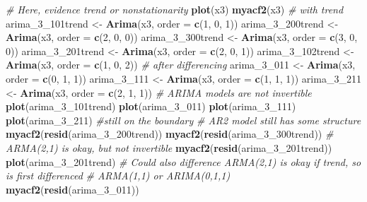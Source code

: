 \documentclass[]{book}
\newenvironment{Shaded}{\begin{snugshade}}{\end{snugshade}}
\newcommand{\KeywordTok}[1]{\textcolor[rgb]{0.13,0.29,0.53}{\textbf{#1}}}
\newcommand{\DataTypeTok}[1]{\textcolor[rgb]{0.13,0.29,0.53}{#1}}
\newcommand{\DecValTok}[1]{\textcolor[rgb]{0.00,0.00,0.81}{#1}}
\newcommand{\StringTok}[1]{\textcolor[rgb]{0.31,0.60,0.02}{#1}}
\newcommand{\CommentTok}[1]{\textcolor[rgb]{0.56,0.35,0.01}{\textit{#1}}}
\newcommand{\NormalTok}[1]{#1}
\begin{document}
\begin{Shaded}
\begin{Highlighting}[]
\CommentTok{# Here, evidence trend or nonstationarity}
\KeywordTok{plot}\NormalTok{(x3)}
\KeywordTok{myacf2}\NormalTok{(x3)}
\CommentTok{# with trend}
\NormalTok{arima_3_101trend <-}\StringTok{ }\KeywordTok{Arima}\NormalTok{(x3, }\DataTypeTok{order =} \KeywordTok{c}\NormalTok{(}\DecValTok{1}\NormalTok{, }\DecValTok{0}\NormalTok{, }\DecValTok{1}\NormalTok{))}
\NormalTok{arima_3_200trend <-}\StringTok{ }\KeywordTok{Arima}\NormalTok{(x3, }\DataTypeTok{order =} \KeywordTok{c}\NormalTok{(}\DecValTok{2}\NormalTok{, }\DecValTok{0}\NormalTok{, }\DecValTok{0}\NormalTok{))}
\NormalTok{arima_3_300trend <-}\StringTok{ }\KeywordTok{Arima}\NormalTok{(x3, }\DataTypeTok{order =} \KeywordTok{c}\NormalTok{(}\DecValTok{3}\NormalTok{, }\DecValTok{0}\NormalTok{, }\DecValTok{0}\NormalTok{))}
\NormalTok{arima_3_201trend <-}\StringTok{ }\KeywordTok{Arima}\NormalTok{(x3, }\DataTypeTok{order =} \KeywordTok{c}\NormalTok{(}\DecValTok{2}\NormalTok{, }\DecValTok{0}\NormalTok{, }\DecValTok{1}\NormalTok{))}
\NormalTok{arima_3_102trend <-}\StringTok{ }\KeywordTok{Arima}\NormalTok{(x3, }\DataTypeTok{order =} \KeywordTok{c}\NormalTok{(}\DecValTok{1}\NormalTok{, }\DecValTok{0}\NormalTok{, }\DecValTok{2}\NormalTok{))}
\CommentTok{# after differencing}
\NormalTok{arima_3_}\DecValTok{011}\NormalTok{ <-}\StringTok{ }\KeywordTok{Arima}\NormalTok{(x3, }\DataTypeTok{order =} \KeywordTok{c}\NormalTok{(}\DecValTok{0}\NormalTok{, }\DecValTok{1}\NormalTok{, }\DecValTok{1}\NormalTok{))}
\NormalTok{arima_3_}\DecValTok{111}\NormalTok{ <-}\StringTok{ }\KeywordTok{Arima}\NormalTok{(x3, }\DataTypeTok{order =} \KeywordTok{c}\NormalTok{(}\DecValTok{1}\NormalTok{, }\DecValTok{1}\NormalTok{, }\DecValTok{1}\NormalTok{))}
\NormalTok{arima_3_}\DecValTok{211}\NormalTok{ <-}\StringTok{ }\KeywordTok{Arima}\NormalTok{(x3, }\DataTypeTok{order =} \KeywordTok{c}\NormalTok{(}\DecValTok{2}\NormalTok{, }\DecValTok{1}\NormalTok{, }\DecValTok{1}\NormalTok{))}
\CommentTok{# ARIMA models are not invertible}
\KeywordTok{plot}\NormalTok{(arima_3_101trend)}
\KeywordTok{plot}\NormalTok{(arima_3_}\DecValTok{011}\NormalTok{)}
\KeywordTok{plot}\NormalTok{(arima_3_}\DecValTok{111}\NormalTok{)}
\KeywordTok{plot}\NormalTok{(arima_3_}\DecValTok{211}\NormalTok{)  }\CommentTok{#still on the boundary}
\CommentTok{# AR2 model still has some structure}
\KeywordTok{myacf2}\NormalTok{(}\KeywordTok{resid}\NormalTok{(arima_3_200trend))}
\KeywordTok{myacf2}\NormalTok{(}\KeywordTok{resid}\NormalTok{(arima_3_300trend))}
\CommentTok{# ARMA(2,1) is okay, but not invertible}
\KeywordTok{myacf2}\NormalTok{(}\KeywordTok{resid}\NormalTok{(arima_3_201trend))}
\KeywordTok{plot}\NormalTok{(arima_3_201trend)}
\CommentTok{# Could also difference ARMA(2,1) is okay if trend, so is first differenced}
\CommentTok{# ARMA(1,1) or ARIMA(0,1,1)}
\KeywordTok{myacf2}\NormalTok{(}\KeywordTok{resid}\NormalTok{(arima_3_}\DecValTok{011}\NormalTok{))}
\end{Highlighting}
\end{Shaded}
\end{document}
